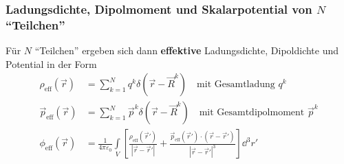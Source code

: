   \subsubsection{Ladungsdichte, Dipolmoment und Skalarpotential von $N$ \enquote{Teilchen}}
		   Für $N$ \enquote{Teilchen} ergeben sich dann \textbf{effektive} Ladungsdichte, Dipoldichte und Potential in  der Form
		        \begin{equation}\begin{split}
				        \rho_{\text{eff}}(\vec{r} ) & = \sum_{k=1}^N q^k\delta (\vec{r}  - \vec{R}^k ) \quad\text{mit Gesamtladung } q^k\\
				        \vec{p}_{\text{eff}}(\vec{r} ) &= \sum_{k=1}^N \vec{p}^k\delta (\vec{r}  - \vec{R}^k ) \quad\text{mit Gesamtdipolmoment } \vec{p}^k\\
				        \phi _{\text{eff}}(\vec{r} ) &= \frac{1}{4\pi\varepsilon_0} \int\limits_V \left[ \frac{\rho_{\text{eff}}(\vec{r}' )}{|\vec{r}  - \vec{r}'  |} + \frac{\vec{p}_{\text{eff}}(\vec{r}' )  \cdot (\vec{r}  - \vec{r}'  )}{|\vec{r}  - \vec{r}'  |^3} \right] \dd^3 r'
			        \end{split}\end{equation}
